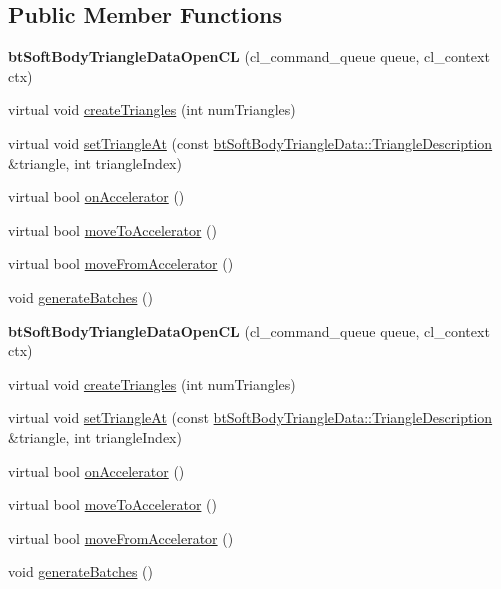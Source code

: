 \subsection*{Public Member Functions}
\begin{DoxyCompactItemize}
\item 
\mbox{\label{classbtSoftBodyTriangleDataOpenCL_ad04c5bf5f3e3f6d3853b5e6117ca3e6b}} 
{\bfseries bt\+Soft\+Body\+Triangle\+Data\+Open\+CL} (cl\+\_\+command\+\_\+queue queue, cl\+\_\+context ctx)
\item 
virtual void \hyperlink{classbtSoftBodyTriangleDataOpenCL_ac92ee63b071604004e9717443248e747}{create\+Triangles} (int num\+Triangles)
\item 
virtual void \hyperlink{classbtSoftBodyTriangleDataOpenCL_ac7f551e48b59ffb15e936c3392d57953}{set\+Triangle\+At} (const \hyperlink{classbtSoftBodyTriangleData_1_1TriangleDescription}{bt\+Soft\+Body\+Triangle\+Data\+::\+Triangle\+Description} \&triangle, int triangle\+Index)
\item 
virtual bool \hyperlink{classbtSoftBodyTriangleDataOpenCL_ae6287090bdc3505f89d495ded41660e8}{on\+Accelerator} ()
\item 
virtual bool \hyperlink{classbtSoftBodyTriangleDataOpenCL_af92cd6a17855e603e73595ad229986f5}{move\+To\+Accelerator} ()
\item 
virtual bool \hyperlink{classbtSoftBodyTriangleDataOpenCL_ab03606a0597e8990959452d975ec7bf2}{move\+From\+Accelerator} ()
\item 
void \hyperlink{classbtSoftBodyTriangleDataOpenCL_a9c2ced4b9c5114595129ded0706e33c1}{generate\+Batches} ()
\item 
\mbox{\label{classbtSoftBodyTriangleDataOpenCL_ad04c5bf5f3e3f6d3853b5e6117ca3e6b}} 
{\bfseries bt\+Soft\+Body\+Triangle\+Data\+Open\+CL} (cl\+\_\+command\+\_\+queue queue, cl\+\_\+context ctx)
\item 
virtual void \hyperlink{classbtSoftBodyTriangleDataOpenCL_a0c2e8772497157c44b5d6526d5a0e8b3}{create\+Triangles} (int num\+Triangles)
\item 
virtual void \hyperlink{classbtSoftBodyTriangleDataOpenCL_a2f1c39d19efd5df0fb191b6af632ecd6}{set\+Triangle\+At} (const \hyperlink{classbtSoftBodyTriangleData_1_1TriangleDescription}{bt\+Soft\+Body\+Triangle\+Data\+::\+Triangle\+Description} \&triangle, int triangle\+Index)
\item 
virtual bool \hyperlink{classbtSoftBodyTriangleDataOpenCL_a076bbaf97478a0756c25bf887e6bba1b}{on\+Accelerator} ()
\item 
virtual bool \hyperlink{classbtSoftBodyTriangleDataOpenCL_a7b9ed62bd458f1397041d6e6bdae44bb}{move\+To\+Accelerator} ()
\item 
virtual bool \hyperlink{classbtSoftBodyTriangleDataOpenCL_a6ff4ef4ea2e8491908c7bf742d4a8833}{move\+From\+Accelerator} ()
\item 
void \hyperlink{classbtSoftBodyTriangleDataOpenCL_a9c2ced4b9c5114595129ded0706e33c1}{generate\+Batches} ()
\end{DoxyCompactItemize}

